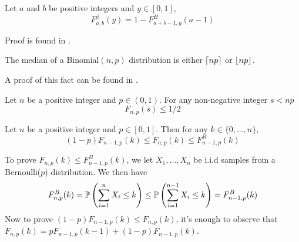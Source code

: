 \begin{lemma} \label{fact:equation_for_beta_binomial_cdfs}
	Let $a$ and $b$ be positive integers and $y \in [0,1]$, 
	\[
	F^\beta_{a,b}(y) = 1 - F^B_{a+b-1,y}(a-1)
	\]
\end{lemma}
\begin{myproof}[Proof.]
	Proof is found in \cite{agrawalanalysis}.
\end{myproof}
\begin{lemma} \label{fact:median_of_binomial_dist}
	The median of a Binomial$(n,p)$ distribution is either $\ceil{np}$ or $\floor{np}$.
\end{lemma}
\begin{myproof}[Proof]
	A proof of this fact can be found in \cite{jogdeo1968monotone}.
\end{myproof}

\begin{corollary} \label{cor:corollarly_of_binomial_median_property}
	Let $n$ be a positive integer and $p \in (0,1)$. For any non-negative integer $s < np$
	\[
	F_{n,p}(s) \le 1/2
	\]
\end{corollary}

\begin{lemma} \label{fact:relationship_with_binom_cdfs}
	Let $n$ be a positive integer and $p \in [0,1]$. Then for any $k \in \{0,\ldots,n\}$,
	\[
	(1-p)F_{n-1,p}(k)\le F_{n,p}(k) \le F^B_{n-1,p}(k)
	\] 
\end{lemma}
\begin{myproof}[Proof]
	To prove $F_{n,p}(k) \le F^B_{n-1,p}(k)$, we let $X_1,\ldots,X_{n}$ be i.i.d samples from a Bernoulli($p$) distribution. We then have
	\begin{align*}
	F^B_{n,p}(k)  = \P{\sum_{i=1}^{n} X_i \le k}  \le  \P{\sum_{i=1}^{n-1} X_i \le k}  = F^B_{n-1,p}(k)
	\end{align*}
	Now to prove $(1-p)F_{n-1,p}(k)\le F_{n,p}(k)$, it's enough to observe that $F_{n,p}(k) = p F_{n-1,p}(k-1) + (1-p) F_{n-1,p}(k)$.
\end{myproof}

